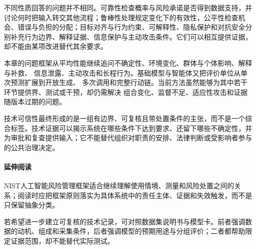 不同性质回答的问题并不相同。可靠性检查概率与风险承诺是否得到数据支持，并讨论何时把输入转交其他流程；鲁棒性处理规定变化下的有效性，公平性检查机会、错误与负担的分配；目标对齐与行为约束、可解释性、隐私保护和对抗安全分别补充行为边界、解释证据、信息保护与主动攻击条件。它们可以相互提供证据，却不能由某项改进替代其余要求。

本章的问题框架从平均性能继续追问不确定性、环境变化、群体与个体影响、解释与补救、
信息泄露、主动攻击和长程行为。基础模型与智能体又把评价单位从单次预测扩展到开放生成、
多次调用和完整行动链。当前方法虽然能够为其中若干环节提供界、测试或干预，却仍需解决
组合变化、监督不足、适应性攻击和证据随版本过期的问题。

技术可信性最终形成的是一组有边界、可复核且带处置条件的主张，而不是一个综合标签。技术证据可以揭示系统在哪些条件下达到要求、还留下哪些不确定性，并为审批和复查提供输入；它不能替代组织对职责的安排、法律判断或受影响者参与的公共治理决定。

\paragraph{延伸阅读}

NIST人工智能风险管理框架适合继续理解使用情境、测量和风险处置之间的关系；阅读时应把框架原则落实为具体系统中的责任主体、证据和失效触发，而不是只保留抽象分类。

若希望进一步建立可复核的技术记录，可对照数据集说明书与模型卡。前者强调数据的动机、组成和采集条件，后者强调模型的预期用途与分组评价；二者都帮助限定证据范围，却不能替代实际测试。
